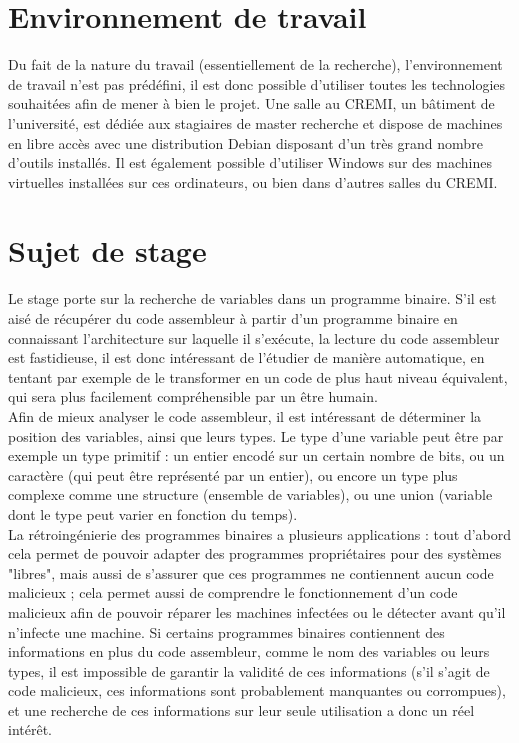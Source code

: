\documentclass[a4paper,12pt]{article}
\begin{document}
\section{Environnement de travail}

Du fait de la nature du travail (essentiellement de la recherche), 
l'environnement de travail n'est pas prédéfini, il est donc possible
d'utiliser toutes les technologies souhaitées afin de mener à bien le
projet. Une salle au CREMI, un bâtiment de l'université, est dédiée aux
stagiaires de master recherche et dispose de machines en libre accès avec
une distribution Debian disposant d'un très grand nombre d'outils installés.
Il est également possible d'utiliser Windows sur des machines virtuelles 
installées sur ces ordinateurs, ou bien dans d'autres salles du CREMI.


\section{Sujet de stage}

Le stage porte sur la recherche de variables dans un programme binaire.
S'il est aisé de récupérer du code assembleur à partir d'un programme
binaire en connaissant l'architecture sur laquelle il s'exécute, la lecture
du code assembleur est fastidieuse, il est donc intéressant de l'étudier
de manière automatique, en tentant par exemple de le transformer en un
code de plus haut niveau équivalent, qui sera plus facilement compréhensible
par un être humain. \\
\indent{}Afin de mieux analyser le code assembleur, il est
intéressant de déterminer la position des variables, ainsi que leurs types.
Le type d'une variable peut être par exemple un type primitif : un entier
encodé sur un certain nombre de bits, ou un caractère (qui peut être
représenté par un entier), ou encore un type plus complexe comme une
structure (ensemble de variables), ou une union (variable dont le type peut
varier en fonction du temps). \\
\indent{}La rétroingénierie des programmes binaires a
plusieurs applications : tout d'abord cela permet de pouvoir adapter des
programmes propriétaires pour des systèmes "libres", mais aussi de
s'assurer que ces programmes ne contiennent aucun code malicieux ; cela permet
aussi de comprendre le fonctionnement d'un code malicieux afin de pouvoir
réparer les machines infectées ou le détecter avant qu'il n'infecte une
machine. Si certains programmes binaires contiennent des informations en
plus du code assembleur, comme le nom des variables ou leurs types, il
est impossible de garantir la validité de ces informations (s'il s'agit
de code malicieux, ces informations sont probablement manquantes ou 
corrompues), et une recherche de ces informations sur leur seule utilisation
a donc un réel intérêt.
\end{document}
